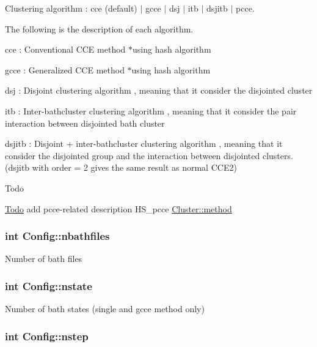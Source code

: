 Clustering algorithm \-: cce (default) $|$ gcce $|$ dsj $|$ itb $|$ dsjitb $|$ pcce. 

The following is the description of each algorithm.


\begin{DoxyItemize}
\item cce \-: Conventional C\-C\-E method $\ast$using hash algorithm
\item gcce \-: Generalized C\-C\-E method $\ast$using hash algorithm
\item dsj \-: Disjoint clustering algorithm , meaning that it consider the disjointed cluster
\item itb \-: Inter-\/bathcluster clustering algorithm , meaning that it consider the pair interaction between disjointed bath cluster
\item dsjitb \-: Disjoint + inter-\/bathcluster clustering algorithm , meaning that it consider the disjointed group and the interaction between disjointed clusters. (dsjitb with order = 2 gives the same result as normal C\-C\-E2) \begin{DoxyRefDesc}{Todo}
\item[\hyperlink{todo__todo000014}{Todo}]add pcce-\/related description H\-S\-\_\-pcce \hyperlink{structCluster_acfc81556c4ed78e0bce4c36119fe7150}{Cluster\-::method}\end{DoxyRefDesc}

\end{DoxyItemize}\hypertarget{structConfig_a26827d7c075042372d21965a827328c3}{
\subsubsection[{nbathfiles}]{\setlength{\rightskip}{0pt plus 5cm}int Config\-::nbathfiles}}\label{structConfig_a26827d7c075042372d21965a827328c3}
Number of bath files \hypertarget{structConfig_a91b2aadf805896022127036ded259e79}{
\subsubsection[{nstate}]{\setlength{\rightskip}{0pt plus 5cm}int Config\-::nstate}}\label{structConfig_a91b2aadf805896022127036ded259e79}
Number of bath states (single and gcce method only) \hypertarget{structConfig_acd1675410784e93a9c9866de0c64807e}{
\subsubsection[{nstep}]{\setlength{\rightskip}{0pt plus 5cm}int Config\-::nstep}}\label{structConfig_acd1675410784e93a9c9866de0c64807e}
